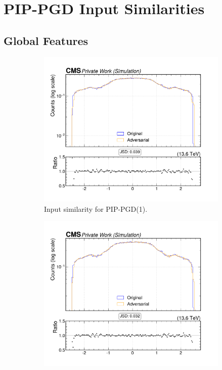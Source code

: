 \section{PIP-PGD Input Similarities}
\label{appendix:combined}

\subsection*{Global Features}


\begin{figure}[htbp]
  \centering
  \begin{subfigure}[t]{0.32\textwidth}
    \includegraphics[width=\linewidth]{media/output/features/compare/combined_it_1/cmp_global_features_jet_eta.pdf}
    \caption*{Input similarity for PIP-PGD(1).}
  \end{subfigure}\hfill
  \begin{subfigure}[t]{0.32\textwidth}
    \includegraphics[width=\linewidth]{media/output/features/compare/combined_it_2/cmp_global_features_jet_eta.pdf}

\end{subfigure}
\end{figure}
